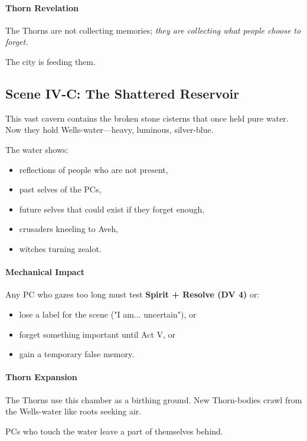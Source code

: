 \documentclass[11pt]{book}
\begin{document}
\paragraph{Thorn Revelation}
The Thorns are not collecting memories;  
\emph{they are collecting what people choose to forget.}

The city is feeding them.

\subsection*{Scene IV-C: The Shattered Reservoir}

This vast cavern contains the broken stone cisterns that once held pure
water. Now they hold Wells-water---heavy, luminous, silver-blue.

The water shows:
\begin{itemize}
    \item reflections of people who are not present,
    \item past selves of the PCs,
    \item future selves that could exist if they forget enough,
    \item crusaders kneeling to Aveh,
    \item witches turning zealot.
\end{itemize}

\paragraph{Mechanical Impact}
Any PC who gazes too long must test \textbf{Spirit + Resolve (DV 4)} or:
\begin{itemize}
    \item lose a label for the scene ("I am... uncertain"), or
    \item forget something important until Act V, or
    \item gain a temporary false memory.
\end{itemize}

\paragraph{Thorn Expansion}
The Thorns use this chamber as a birthing ground. New Thorn-bodies
crawl from the Wells-water like roots seeking air.

PCs who touch the water leave a part of themselves behind.
\end{document}
